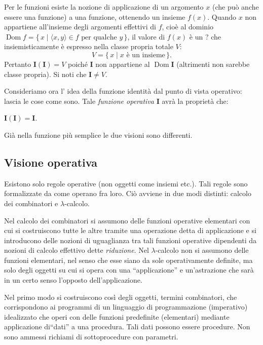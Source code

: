 \documentclass{book}
\newcommand*{\Dom}{\mathop{\mathrm{Dom}}\nolimits}
\begin{document}
Per le funzioni esiste la nozione di applicazione di un argomento $x$ (che
pu\`o anche essere una funzione) a una funzione, ottenendo un insieme $f(x)$.
Quando $x$ non appartiene all'insieme degli argomenti effettivi di $f$,
cio\`e al dominio $\Dom f = \bigl\{\,  x \mid \langle x, y \rangle \in f 
\text{ per qualche } y \,
\bigr\}$, il valore di $f(x)$ \`e un ? che insiemisticamente \`e espresso
nella classe propria totale $V$:
\[
V = \{\, x \mid  x \text{ \`e un insieme} \,\}.
\]
Pertanto $\mathbf{I}(\mathbf{I}) = V$ poich\'e $\mathbf{I}$ non appartiene al
$\Dom \mathbf{I}$ (altrimenti non sarebbe classe propria).
Si noti che $\mathbf{I} \neq V$.


Consideriamo ora l' idea della funzione identit\`a dal punto di vista
operativo: lascia le cose come sono.
Tale \emph{funzione operativa} $\mathbf{I}$ avr\`a la propriet\`a che:
\begin{center}
$\mathbf{I}(\mathbf{I}) = \mathbf{I}$.
\end{center}
Gi\`a nella funzione pi\`u semplice le due visioni sono differenti.

\subsection{Visione operativa}

Esistono solo regole operative (non oggetti come insiemi etc.). Tali regole
sono formalizzate da come operano fra loro. Ci\`o avviene in due modi
distinti: calcolo dei combinatori e $\lambda$-calcolo.

Nel calcolo dei combinatori si assumono delle funzioni operative elementari
con cui si costruiscono tutte le altre tramite una operazione detta di
applicazione e si introducono delle nozioni di uguaglianza tra tali funzioni
operative dipendenti da nozioni di calcolo effettivo dette \emph{riduzione}.
Nel $\lambda$-calcolo non si assumono delle funzioni elementari, nel senso che
esse siano da sole operativamente definite, ma solo degli oggetti su cui si
opera con una ``applicazione''  e un'astrazione che sar\`a in un certo senso
l'opposto dell'applicazione.

Nel primo modo si costruiscono cos\`i degli oggetti, termini combinatori, che 
corrispondono ai programmi di un linguaggio di programmazione (imperativo) 
idealizzato che operi con delle funzioni predefinite (elementari) mediante 
applicazione di``dati'' a una procedura. Tali dati possono essere procedure.
Non sono ammessi richiami di sottoprocedure con parametri.
\end{document}
